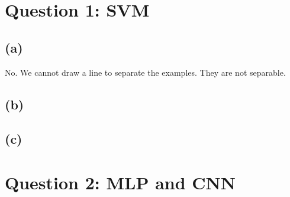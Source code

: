 \documentclass{article}
\begin{document}
\pagestyle{fancy}


\section{\textbf{Question 1: SVM}}

\subsection{\textbf{(a)}}
No. We cannot draw a line to separate the examples. They are not separable.


\subsection{\textbf{(b)}}
\subsection{\textbf{(c)}}


\section{\textbf{Question 2: MLP and CNN}}
\end{document}
